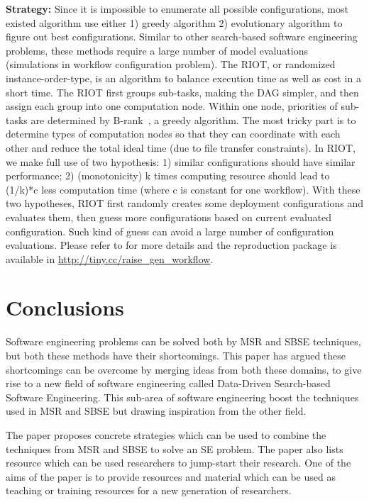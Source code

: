 \documentclass[table, xcdraw, sigconf,review, anonymous]{acmart}
\begin{document}
\noindent\textbf{Strategy:} 
Since it is impossible to enumerate all possible configurations, most existed algorithm use either 1) greedy algorithm 2) evolutionary algorithm to figure out best configurations.
Similar to other search-based software engineering problems,
these methods require a large number of model evaluations (simulations in workflow configuration problem).
The RIOT, or randomized instance-order-type, is an algorithm to balance execution time as well as cost
in a short time.
The RIOT first groups sub-tasks, making the DAG simpler, and then
assign each group into one computation node. Within one node,
priorities of sub-tasks are determined by
B-rank~\cite{topcuoglu2002performance}, a greedy algorithm. 
The most tricky part is to determine types of computation nodes so that they can coordinate with each other and reduce the total ideal time (due to file transfer constraints).
In RIOT,
we make full use of two hypothesis: 1) similar configurations should have similar performance; 2) (monotonicity) k times computing resource should lead to (1/k)*c less computation time (where c is constant for one workflow).
With these two hypotheses,
RIOT first randomly creates some deployment configurations and evaluates them, then guess more configurations based on current evaluated configuration. Such kind of guess can avoid a large number of configuration evaluations. Please refer to \cite{chen2017riot} for more details and the reproduction package is available in \url{http://tiny.cc/raise_gen_workflow}.





\section{Conclusions}
Software engineering problems can be solved both by MSR and SBSE techniques, but both these methods have their shortcomings. This paper has argued these shortcomings can be overcome by merging ideas from both these domains, to give rise to a new field of software engineering called Data-Driven Search-based Software Engineering. This sub-area of software engineering boost the techniques used in MSR and SBSE but drawing inspiration from the other field. 

The paper proposes concrete strategies which can be used to combine the techniques from MSR and SBSE to solve an SE problem. The paper also lists resource which can be used researchers to jump-start their research. One of the aims of the paper is to provide resources and material which can be used as teaching or training resources for a new generation of researchers. 

% 
% 


 
\end{document}
